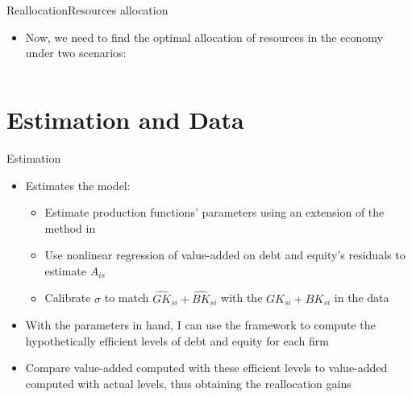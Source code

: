 \documentclass[aspectratio=169]{beamer}
\begin{document}
\begin{frame}{Reallocation}{Resources allocation}
	\begin{itemize}
		\item Now, we need to find the optimal allocation of resources in the economy under two scenarios:
		\begin{columns}[T] %

			\begin{column}{0.5\textwidth} %
				
			\end{column}
			\begin{column}{0.5\textwidth} %
				
			\end{column}
		\end{columns}			
	\end{itemize}
\end{frame}



\section{Estimation and Data}
\begin{frame}{Estimation}
	\begin{itemize}
		\item Estimates the model:
		\begin{itemize}
			\item Estimate production functions' parameters using an extension of the method in  \cite{kmenta1967estimation}
			\item Use nonlinear regression of value-added on debt and equity's residuals to estimate $A_{is}$
			\item Calibrate $\sigma$ to match $\hat{GK}_{si} + \hat{BK}_{si}$ with the $GK_{si} + BK_{si}$ in the data
		\end{itemize}
		\item With the parameters in hand, I can use the framework to compute the hypothetically efficient levels of debt and equity for each firm
		\item Compare value-added computed with these efficient levels to value-added computed with actual levels, thus obtaining the reallocation gains
	\end{itemize}
\end{frame}
\end{document}
